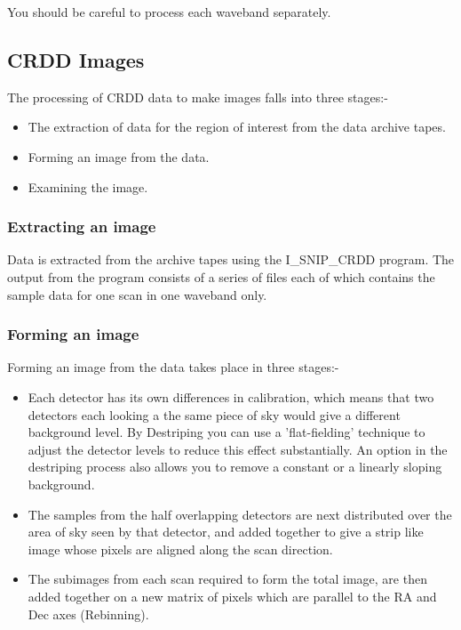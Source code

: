 You should be careful to process each waveband separately.

\subsection{CRDD Images}

The processing of CRDD data to make images falls into three stages:-
\begin{itemize}
\item The extraction of data for the region of interest from the data archive
tapes.
\item Forming an image from the data.
\item Examining the image.
\end{itemize}

\subsubsection{Extracting an image}

Data is extracted from the archive tapes using the I\_SNIP\_CRDD program.
The output from the program consists of a series of files each of which
contains the sample data for one scan in one waveband only.

\subsubsection{Forming an image}

Forming an image from the data takes place in three stages:-
\begin{itemize}
\item Each detector has its own differences in calibration, which means that two
detectors each looking a the same piece of sky would give a different background
level. By Destriping you can use a 'flat-fielding' technique  to adjust the
detector levels to reduce this effect substantially. An option in the
destriping process also allows you to remove a constant or a linearly sloping
background.
\item The samples from the half overlapping detectors are next distributed over
the area of sky seen by that detector, and added together to give a strip
like image whose pixels are aligned along the scan direction.
\item The subimages from each scan required to form the total image, are then
added together on a new matrix of pixels which are parallel to the RA and Dec
axes (Rebinning).
\end{itemize}

